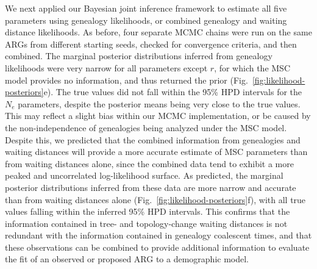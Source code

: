 \documentclass[11pt]{article}
\begin{document}
We next applied our Bayesian joint inference framework to estimate all five 
parameters using genealogy likelihoods, or combined genealogy and waiting 
distance likelihoods. 
As before, four separate MCMC chains were run on the same ARGs from different
starting seeds, checked for convergence criteria, and then combined.
The marginal posterior distributions inferred from genealogy likelihoods 
were very narrow for all parameters except $r$, for which the MSC model
provides no information, and thus returned the prior
(Fig.~\ref{fig:likelihood-posteriors}e). 
The true values did not fall within the 95\% HPD intervals for the $N_e$
parameters, despite the posterior means being very close to the true 
values. 
This may reflect a slight bias within our MCMC implementation, or be caused
by the non-independence of genealogies being analyzed under the MSC model.
Despite this, we predicted that the combined information from genealogies
and waiting distances will provide a more accurate estimate of MSC 
parameters than from waiting distances alone, since the combined data 
tend to exhibit a more peaked and uncorrelated log-likelihood surface.
As predicted, the marginal posterior distributions inferred from these data
are more narrow and accurate than from waiting distances alone
(Fig.~\ref{fig:likelihood-posteriors}f), with all true values falling 
within the inferred 95\% HPD intervals.
This confirms that the information contained in tree- and topology-change
waiting distances is not redundant with the information contained in 
genealogy coalescent times, and that these observations can be combined
to provide additional information to evaluate the fit of an observed
or proposed ARG to a demographic model.


\end{document}
